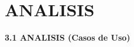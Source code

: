 \section{ANALISIS} 
\begin{flushleft}
\textbf {3.1 ANALISIS (Casos de Uso)}\\

\textbf{}\\


\end{flushleft}